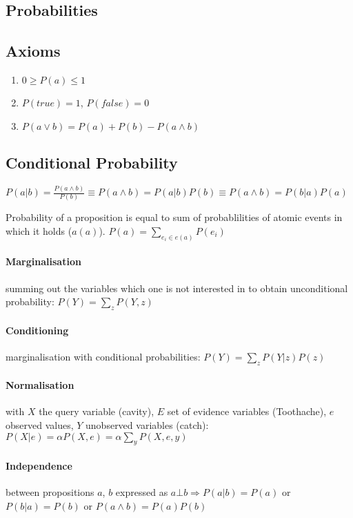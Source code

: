 \begin{multicols}{4}
\section{Probabilities}

\subsection{Axioms}
\begin{enumerate}
\item $0 \geq P(a) \leq 1$
\item $P(true) = 1$, $P(false) = 0$
\item $P(a \lor b) = P(a) + P(b) - P(a \land b)$
\end{enumerate}

\subsection{Conditional Probability}
$P(a|b) = \frac{P(a \land b)}{P(b)} \equiv P(a \land b) = P(a|b)P(b) \equiv P(a \land b) = P(b|a)P(a)$

Probability of a proposition is equal to sum of probablilities of atomic events in which it holds ($a(a)$).
$P(a) = \sum_{e_i \in e(a)}{P(e_i)}$

\paragraph{Marginalisation} summing out the variables which one is not interested in to obtain unconditional probability: $P(Y) = \sum_z P(Y,z)$

\paragraph{Conditioning} marginalisation with conditional probabilities: $P(Y) = \sum_z P(Y|z)P(z)$

\paragraph{Normalisation} with $X$ the query variable (cavity), $E$ set of evidence variables (Toothache), $e$ observed values, $Y$ unobserved variables (catch): $P(X|e) = \alpha P(X,e) = \alpha \sum_y P(X,e,y)$

\paragraph{Independence} between propositions $a$, $b$ expressed as $a \bot b \Rightarrow P(a|b) = P(a)$ or $P(b|a) = P(b)$ or $P(a \land b) = P(a)P(b)$


\end{multicols}
